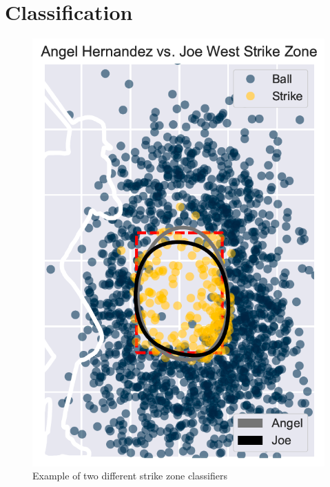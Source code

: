 \documentclass[letterpaper,12pt]{article}
\begin{document}
\section{Classification}\label{sec:classification}
\begin{figure}
\vspace{-0.6cm}
\centering
  \includegraphics[scale=0.2]{graphics/batter.png}
  \caption{Example of two different strike zone classifiers}
  \label{fig:example-sz}

\end{figure}
\end{document}
